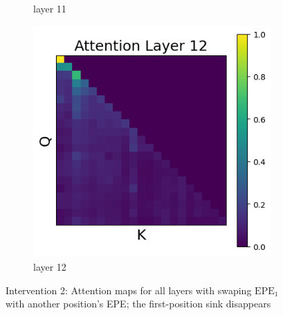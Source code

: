 \documentclass[11pt]{article}
\begin{document}
\begin{figure}[t]
\begin{subfigure}[t]{0.24\textwidth}
    \caption{layer 11}
  \end{subfigure}\hfill
  \begin{subfigure}[t]{0.24\textwidth}
    \centering
    \includegraphics[width=1.4\columnwidth]{figures/intervention2/layer_12.png}
    \caption{layer 12}
  \end{subfigure}\hfill

  \caption{Intervention 2: Attention maps for all layers with swaping $\mathrm{EPE}_1$ with another position’s EPE; the first-position sink disappears}
\end{figure}
\end{document}

